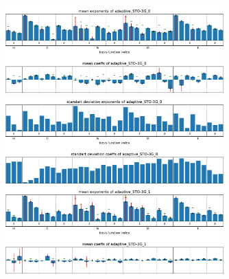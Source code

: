 \begin{figure}
    \includegraphics[width=0.75\textwidth]{chapters/results/results_images/adaptive_basis_functions/mean_exps_and_coeffsadaptive_STO-3G_0}
    \includegraphics[width=0.75\textwidth]{chapters/results/results_images/adaptive_basis_functions/std_exps_and_coeffsadaptive_STO-3G_0}
    \includegraphics[width=0.75\textwidth]{chapters/results/results_images/adaptive_basis_functions/mean_exps_and_coeffsadaptive_STO-3G_1}
    \end{figure}

